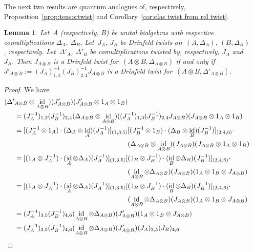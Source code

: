 \documentclass[12pt, reqno]{amsart}
\newtheorem{lemma}[theorem]{Lemma}
\theoremstyle{definition}
\numberwithin{equation}{section}
\newcommand{\tensor}{\otimes}
\DeclareMathOperator{\id}{id}
\begin{document}
The next two results are quantum analogues of, respectively, Proposition~\ref{prop:tensortwist} and
Corollary~\ref{cor:clas twist from rel twist}.
\begin{lemma}\label{lem:rel twist from twist}
Let~$A$ (respectively, $B$) be unital bialgebras with
respective comultiplications $\Delta_A$, $\Delta_B$. Let~$J_A$, $J_B$ be Drinfeld twists on~$(A,\Delta_A)$, $(B,\Delta_B)$, respectively. Let~$\Delta'_A$, $\Delta'_B$ be comultiplications 
twisted by, respectively, $J_A$ and~$J_B$. 
Then
$J_{A\tensor B}$ is a Drinfeld twist for~$(A\tensor B,\Delta_{A\tensor B})$ if and only if~$J'_{A\tensor B}:=(J_A)_{1,3}^{-1}
(J_B)_{2,4}^{-1}J_{A\tensor B}$ is a Drinfeld twist for~$(A\tensor B,\Delta'_{A\tensor B})$.
\end{lemma}
\begin{proof}
We have
\begin{align*}
(\Delta'&_{A\tensor B}\tensor\id_{A\tensor B})(J'_{A\tensor B})(J'_{A\tensor B}\tensor 1_A\tensor 1_B)\\&=
(J_A^{-1})_{1,3}(J_B^{-1})_{2,4}(\Delta_{A\tensor B}\tensor 
\id_{A\tensor B})((J_A^{-1})_{1,3}(J_B^{-1})_{2,4}J_{A\tensor B})
(J_{A\tensor B}\tensor 1_A\tensor 1_B)\\
&=[(J_A^{-1}\tensor 1_A)\cdot(\Delta_A\tensor\id_A)(J_A^{-1})]_{(1,3,5)}[(J_B^{-1}\tensor 1_B)\cdot (\Delta_B\tensor\id_B)(J_B^{-1})]_{(2,4,6)}\cdot\\
&\mskip300mu
(\Delta_{A\tensor B}\tensor 
\id_{A\tensor B})(J_{A\tensor B})
(J_{A\tensor B}\tensor 1_A\tensor 1_B)\\
&=[(1_A \tensor J_A^{-1})\cdot(\id_A\tensor\Delta_A)(J_A^{-1})]_{(1,3,5)}[(1_B\tensor J_B^{-1})\cdot (\id_B\tensor\Delta_B)(J_B^{-1})]_{(2,4,6)}\cdot\\
&\mskip300mu
(\id_{A\tensor B}\tensor 
\Delta_{A\tensor B})(J_{A\tensor B})
(1_A\tensor 1_B\tensor J_{A\tensor B})\\
&=[(1_A \tensor J_A^{-1})\cdot(\id_A\tensor\Delta_A)(J_A^{-1})]_{(1,3,5)}[(1_B\tensor J_B^{-1})\cdot (\id_B\tensor\Delta_B)(J_B^{-1})]_{(2,4,6)}\cdot\\
&\mskip300mu
(\id_{A\tensor B}\tensor 
\Delta_{A\tensor B})(J_{A\tensor B})
(1_A\tensor 1_B\tensor J_{A\tensor B})\\
&=(J_A^{-1})_{3,5}(J_B^{-1})_{4,6}(\id_{A\tensor B}\tensor\Delta_{A\tensor B})(J'_{A\tensor B})(1_A\tensor 1_B\tensor J_{A\tensor B})\\
&=(J_A^{-1})_{3,5}(J_B^{-1})_{4,6}(\id_{A\tensor B}\tensor\Delta_{A\tensor B})(J'_{A\tensor B})(J_A)_{3,5}(J_B)_{4,6}

\end{align*}
\end{proof}
\end{document}
